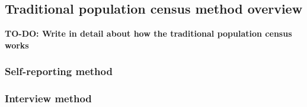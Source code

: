 \subsection{Traditional population census method overview}
\textbf{TO-DO: Write in detail about how the traditional population census works}
\subsubsection{Self-reporting method}

\subsubsection{Interview method}